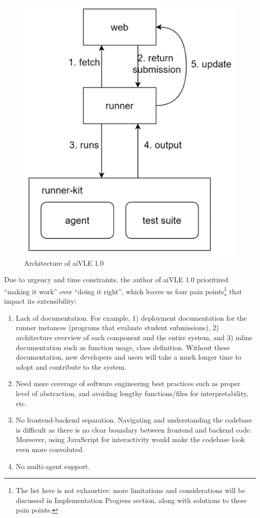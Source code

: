 \begin{figure}[H]
    \centering
    \includegraphics{images/aivle_1_arch.png}
    \caption{Architecture of aiVLE 1.0}
    \label{fig:aivle-1-arch}
\end{figure}

Due to urgency and time constraints, the author of aiVLE 1.0 prioritized “making it work” over “doing it right”, which leaves us four pain points\footnote{The list here is not exhaustive: more limitations and considerations will be discussed in Implementation Progress section, along with solutions to these pain points.} that impact its extensibility:

\begin{enumerate}
    \item Lack of documentation. For example, 1) deployment documentation for the runner instances (programs that evaluate student submissions), 2) architecture overview of each component and the entire system, and 3) inline documentation such as function usage, class definition. Without these documentation, new developers and users will take a much longer time to adopt and contribute to the system. 
    \item Need more coverage of software engineering best practices such as proper level of abstraction, and avoiding lengthy functions/files for interpretability, etc.
    \item No frontend-backend separation. Navigating and understanding the codebase is difficult as there is no clear boundary between frontend and backend code. Moreover, using JavaScript for interactivity would make the codebase look even more convoluted.
    \item No multi-agent support.
\end{enumerate}

